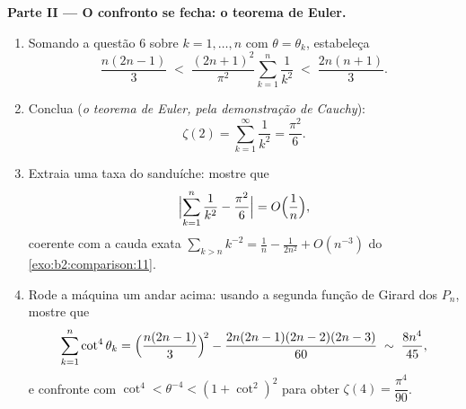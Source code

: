 \begin{problem}[{Problema de fim de semana --- $\zeta(2) = \pi^2/6$ e o
panorama de Bertrand}]
\medskip
\noindent\textbf{Parte II --- O confronto se fecha: o teorema de
Euler.}
\begin{enumerate}[resume]
  \item Somando a questão 6 sobre $k = 1, \dots, n$ com $\theta =
        \theta_k$, estabeleça
        \[
        \frac{n(2n-1)}{3} \;<\;
        \frac{(2n+1)^2}{\pi^2}\sum_{k=1}^{n}\frac1{k^2}
        \;<\; \frac{2n(n+1)}{3}.
        \]
  \item Conclua (\emph{o teorema de Euler, pela demonstração de Cauchy}):
        \[
        \zeta(2) = \sum_{k=1}^{\infty}\frac{1}{k^2} =
        \frac{\pi^2}{6}.
        \]
  \item Extraia uma taxa do sanduíche: mostre que
        \[
        \Bigl|\sum_{k=1}^{n}\frac1{k^2} - \frac{\pi^2}6\Bigr|
        = O\Bigl(\frac1n\Bigr),
        \]
        coerente com a cauda exata $\sum_{k>n}k^{-2} =
        \frac1n - \frac{1}{2n^2} + O(n^{-3})$ do
        \cref{exo:b2:comparison:11}.
  \item Rode a máquina um andar acima: usando a segunda função de Girard
        dos $P_n$, mostre que
        \[
        \sum_{k=1}^{n}\cot^4\theta_k =
        \Bigl(\frac{n(2n-1)}3\Bigr)^{\!2} -
        \frac{2n(2n-1)(2n-2)(2n-3)}{60}
        \;\sim\; \frac{8n^4}{45},
        \]
        e confronte com $\cot^4 < \theta^{-4} < (1 +
        \cot^2)^2$ para obter $\zeta(4) = \dfrac{\pi^4}{90}$.
\end{enumerate}


\end{problem}

